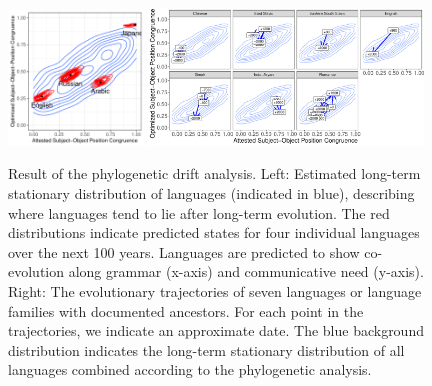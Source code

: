 \documentclass[9pt,twocolumn,twoside,lineno]{pnas-new}
\begin{document}
\begin{figure}
    \includegraphics[width=0.32\textwidth]{../change/visualize/stationary.pdf}
    \includegraphics[width=0.65\textwidth]{../analysis/figures/historical_2.6_times_stationary_layout.pdf}
    \caption{Result of the phylogenetic drift analysis.
	Left: Estimated long-term stationary distribution of languages (indicated in blue), describing where languages tend to lie after long-term evolution.
    The red distributions indicate predicted states for four individual languages over the next 100 years. Languages are predicted to show co-evolution along grammar (x-axis)  and communicative need (y-axis).	    
Right: The evolutionary trajectories of seven languages or language families with documented ancestors. For each point in the trajectories, we indicate an approximate date. The blue background distribution indicates the long-term stationary distribution of all languages combined according to the phylogenetic analysis. }
    \label{fig:historical}\label{fig:drift-model}
\end{figure}
\end{document}
